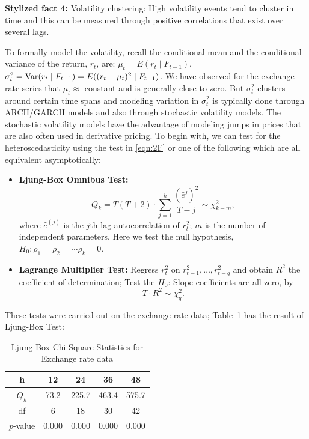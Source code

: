 \noindent\textbf{Stylized fact 4:} Volatility clustering: High volatility events tend to cluster in time and this can be measured through positive correlations that exist over several lags.


To formally model the volatility, recall the conditional mean and the conditional variance of the return, $r_t$, are: $\mu_t = E(r_t \;|\; F_{t-1})$, $\sigma_t^2 = \operatorname{Var}(r_t \;|\; F_{t-1}) = E( (r_t - \mu_t)^2 \;|\; F_{t-1})$. We have observed for the exchange rate series that $\mu_t \approx$ constant and is generally close to zero. But $\sigma_t^2$ clusters around certain time spans and modeling variation in $\sigma_t^2$ is typically done through ARCH/GARCH models and also through stochastic volatility models. The stochastic volatility models have the advantage of modeling jumps in prices that are also often used in derivative pricing. To begin with, we can test for the heteroscedasticity using the test in \eqref{eqn:2F} or one of the following which are all equivalent asymptotically:


\begin{itemize}
\item \textbf{Ljung-Box Omnibus Test:}
	\begin{equation} \label{eqn:2Qk}
	Q_k = T(T+2) \cdot \sum_{j=1}^k\frac{(\hat{e}^{j})^2}{T - j} \sim \chi_{k-m}^2,
	\end{equation}
where $\hat{e}^{(j)}$ is the $j$th lag autocorrelation of $r_t^2$; $m$ is the number of independent parameters. Here we test the null hypothesis, $H_0: \rho_1 = \rho_2 = \cdots \rho_k = 0$.

\item \textbf{Lagrange Multiplier Test:} Regress $r_t^2$ on $r_{t-1}^2, \ldots, r_{t-q}^2$ and obtain $R^2$ the coefficient of determination; Test the $H_0$: Slope coefficients are all zero, by
	\begin{equation} \label{eqn:2TstarR}
	T \cdot R^2 \sim \chi_q^2.
	\end{equation}
\end{itemize}


These tests were carried out on the exchange rate data; Table~\ref{tab:box} has the result of Ljung-Box Test: 
        \begin{table}[!ht]
        \centering
        \caption{Ljung-Box Chi-Square Statistics for Exchange rate data \label{tab:box}}
        	\begin{tabular}{ccccc}
        	 h & 12 & 24 & 36 & 48 \\ \hline
        	$Q_h$ & 73.2 & 225.7 & 463.4 & 575.7 \\ \hline
        	df & 6 & 18 & 30 & 42 \\ \hline
        	$p$-value & 0.000 & 0.000 & 0.000 & 0.000 \\
        \end{tabular}
        \end{table}


